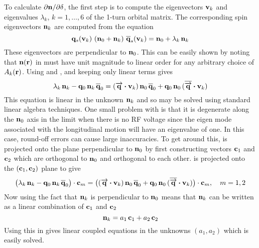 To calculate $\partial{\bf n}/\partial\delta$, the first step is to compute the eigenvectors ${\bf v}_k$ and
eigenvalues $\lambda_k$, $k = 1, \ldots, 6$ of the 1-turn orbital matrix. The
corresponding spin eigenvectors ${\bf n}_k$ are computed from the equation
\begin{equation}
  \bfq_s(\bfv_k) \,\, (\bfn_0 + \bfn_k) \,\, \BAR\bfq_s(\bfv_k) = \bfn_0 + \lambda_k \, \bfn_k
  \label{qnnq}
\end{equation}
These eigenvectors are perpendicular to ${\bf n}_0$. This can be easily shown by noting that
${\bf n}({\bf r})$ in  must have unit magnitude to linear order for any arbitrary choice of
$A_k({\bf r})$. Using  and , and keeping only linear terms gives
\begin{equation}
  \lambda_k \, \bfn_k - \bfq_0 \, \bfn_k \, \BAR\bfq_0 = 
  (\arrowbfq \dotproduct \bfv_k) \, \bfn_0 \, \BAR\bfq_0 + 
  \bfq_0 \, \bfn_0 \, (\BAR\arrowbfq \dotproduct \bfv_k)
  \label{lnqnq}
\end{equation}
This equation is linear in the unknown ${\bf n}_k$ and so may be solved using standard linear
algebra techniques. One small problem with  is that it is degenerate along the ${\bf n}_0$
axis in the limit when there is no RF voltage since the eigen mode associated with the longitudinal
motion will have an eigenvalue of one. In this case, round-off errors can cause large
inaccuracies. To get around this,  is projected onto the plane perpendicular to ${\bf n}_0$
by first constructing vectors ${\bf c}_1$ and ${\bf c}_2$ which are orthogonal to ${\bf n}_0$ and orthogonal
to each other.  is projected onto the $({\bf c}_1, {\bf c}_2)$ plane to give
\begin{align}
  \big( \lambda_k \, \bfn_k - \bfq_0 \, \bfn_k \, \BAR\bfq_0 \big) \cdot \bfc_m = 
  \big( (\arrowbfq \dotproduct \bfv_k) \, \bfn_0 \, \BAR\bfq_0 + 
  \bfq_0 \, \bfn_0 \, (\BAR\arrowbfq \dotproduct \bfv_k) \big) \cdot \bfc_m,
  \quad m = 1, 2
  \label{lnqnq2}
\end{align}
Now using the fact that ${\bf n}_k$ is perpendicular to ${\bf n}_0$ means that ${\bf n}_k$ can be written as
a linear combination of ${\bf c}_1$ and ${\bf c}_2$
\begin{equation}
  {\bf n}_k = a_1 \, {\bf c}_1 + a_2 \, {\bf c}_2
\end{equation}
Using this in  gives linear coupled equations in the unknowns $(a_1, a_2)$ which is easily solved.

